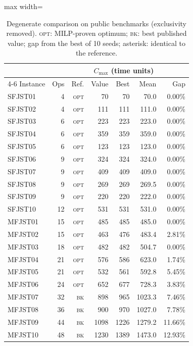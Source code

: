 \documentclass[preprint,review,12pt,authoryear,doubleblind]{elsarticle}
\newcommand{\NSeeds}{10}
\begin{document}
\begin{table}[!htbp]
\caption{Degenerate comparison on public benchmarks (exclusivity removed). \textsc{opt}: MILP-proven optimum; \textsc{bk}: best published value; gap from the best of \NSeeds{} seeds; asterisk: identical to the reference.}
\label{tab:external}
\centering
\small
\begin{adjustbox}{max width=\linewidth}\begin{tabular}{lrrrrrr}
\toprule
& & & \multicolumn{3}{c}{$C_{\max}$ (time units)} & \\
\cmidrule(lr){4-6}
Instance & Ops & Ref. & \multicolumn{1}{c}{Value} & Best & Mean & Gap \\
\midrule
SFJST01 & 4 & \textsc{opt} & 70 & 70\rlap{$^*$} & 70.0 & 0.00\% \\
SFJST02 & 4 & \textsc{opt} & 111 & 111\rlap{$^*$} & 111.0 & 0.00\% \\
SFJST03 & 6 & \textsc{opt} & 223 & 223\rlap{$^*$} & 223.0 & 0.00\% \\
SFJST04 & 6 & \textsc{opt} & 359 & 359\rlap{$^*$} & 359.0 & 0.00\% \\
SFJST05 & 6 & \textsc{opt} & 123 & 123\rlap{$^*$} & 123.0 & 0.00\% \\
SFJST06 & 9 & \textsc{opt} & 324 & 324\rlap{$^*$} & 324.0 & 0.00\% \\
SFJST07 & 9 & \textsc{opt} & 409 & 409\rlap{$^*$} & 409.0 & 0.00\% \\
SFJST08 & 9 & \textsc{opt} & 269 & 269\rlap{$^*$} & 269.5 & 0.00\% \\
SFJST09 & 9 & \textsc{opt} & 220 & 220\rlap{$^*$} & 222.0 & 0.00\% \\
SFJST10 & 12 & \textsc{opt} & 531 & 531\rlap{$^*$} & 531.0 & 0.00\% \\
MFJST01 & 15 & \textsc{opt} & 485 & 485\rlap{$^*$} & 485.0 & 0.00\% \\
MFJST02 & 15 & \textsc{opt} & 463 & 476 & 483.4 & 2.81\% \\
MFJST03 & 18 & \textsc{opt} & 482 & 482\rlap{$^*$} & 504.7 & 0.00\% \\
MFJST04 & 21 & \textsc{opt} & 576 & 586 & 623.0 & 1.74\% \\
MFJST05 & 21 & \textsc{opt} & 532 & 561 & 592.8 & 5.45\% \\
MFJST06 & 24 & \textsc{opt} & 652 & 677 & 728.3 & 3.83\% \\
MFJST07 & 32 & \textsc{bk} & 898 & 965 & 1023.3 & 7.46\% \\
MFJST08 & 36 & \textsc{bk} & 900 & 970 & 1027.0 & 7.78\% \\
MFJST09 & 44 & \textsc{bk} & 1098 & 1226 & 1279.2 & 11.66\% \\
MFJST10 & 48 & \textsc{bk} & 1230 & 1389 & 1473.0 & 12.93\% \\
\bottomrule
\end{tabular}\end{adjustbox}
\end{table}
\end{document}
